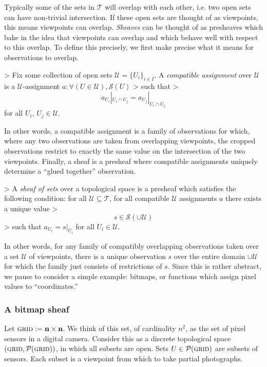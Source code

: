 Typically some of the sets in $\mathcal{T}$ will overlap with each other, i.e. two open sets can have non-trivial intersection. If these open sets are thought of as viewpoints, this means viewpoints can overlap. \emph{Sheaves} can be thought of as presheaves which bake in the idea that viewpoints can overlap and which behave well with respect to this overlap. To define this precisely, we first make precise what it means for observations to overlap.

\begin{definition}
>   Fix some collection of open sets $\mathcal{U} = \{U_i\}_{i \in I}$. A \emph{compatible assignment} over $\mathcal{U}$ is a $\mathcal{U}$-assignment $a : \forall (U \in \mathcal{U}), \mathcal{S}(U)$
>   such that
>   \[a_{U_i} |_{U_i \cap U_j} = a_{U_j} |_{U_i \cap U_j}\] for all $U_i$, $U_j \in \mathcal{U}$.
\end{definition}
In other words, a compatible assignment is a family of observations for which, where any two observations are taken from overlapping viewpoints, the cropped observations restrict to exactly the same value on the intersection of the two viewpoints. Finally, a sheaf is a presheaf where compatible assignments uniquely determine a ``glued together'' observation.
\begin{definition}
>   A \emph{sheaf of sets} over a topological space is a presheaf which satisfies the following condition: for all $\mathcal{U}\subseteq \mathcal{T}$, for all compatible $\mathcal{U}$ assignments $a$ there exists a unique value
>   \[s\in \mathcal{S}(\cup \mathcal{U})\]
>   such that $a_{U_i} = s|_{U_i}$ for all $U_i \in \mathcal{U}$.
\end{definition}
In other words, for any family of compatibly overlapping observations taken over a set $\mathcal{U}$ of viewpoints, there is a unique observation $s$ over the entire domain $\cup \mathcal{U}$ for which the family just consists of restrictions of $s$. Since this is rather abstract, we pause to consider a simple example: bitmaps, or functions which assign pixel values to ``coordinates.''

\subsubsection{A bitmap sheaf}
Let $\textsc{grid} := \mathbf{n} \times \mathbf{n}$. We think of this set, of cardinality $n^2$, as the set of pixel sensors in a digital camera. Consider this as a discrete topological space $\left(\textsc{grid}, \mathcal{P}(\textsc{grid})\right)$, in which all subsets are open. Sets $U \in \mathcal{P}(\textsc{grid})$ are subsets of sensors. Each subset is a viewpoint from which to take partial photographs.

